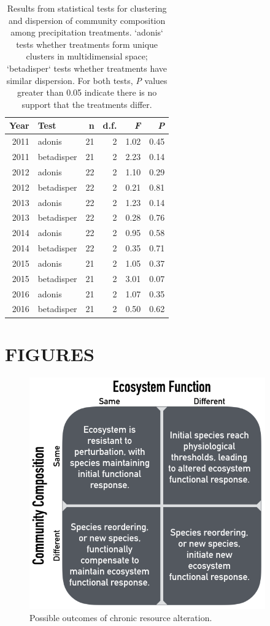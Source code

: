 \documentclass[fleqn,10pt]{wlpeerj} %
\begin{document}
\begin{table}[ht]
\centering
\caption{Results from statistical tests for clustering and dispersion of community composition among precipitation treatments. `adonis` tests whether treatments form unique clusters in multidimensial space; `betadisper` tests whether treatments have similar dispersion. For both tests, \emph{P} values greater than 0.05 indicate there is no support that the treatments differ.} 
\begingroup\normalsize
\begin{tabular}{rlrrrr}
  \hline
Year & Test & n & d.f. & \emph{F} & \emph{P} \\ 
  \hline
2011 & adonis &  21 &   2 & 1.02 & 0.45 \\ 
  2011 & betadisper &  21 &   2 & 2.23 & 0.14 \\ 
  2012 & adonis &  22 &   2 & 1.10 & 0.29 \\ 
  2012 & betadisper &  22 &   2 & 0.21 & 0.81 \\ 
  2013 & adonis &  22 &   2 & 1.23 & 0.14 \\ 
  2013 & betadisper &  22 &   2 & 0.28 & 0.76 \\ 
  2014 & adonis &  22 &   2 & 0.95 & 0.58 \\ 
  2014 & betadisper &  22 &   2 & 0.35 & 0.71 \\ 
  2015 & adonis &  21 &   2 & 1.05 & 0.37 \\ 
  2015 & betadisper &  21 &   2 & 3.01 & 0.07 \\ 
  2016 & adonis &  21 &   2 & 1.07 & 0.35 \\ 
  2016 & betadisper &  21 &   2 & 0.50 & 0.62 \\ 
   \hline
\end{tabular}
\endgroup
\end{table}

\newpage{}

\section{FIGURES}\label{figures}

\begin{figure}[!ht]
  \centering
      \includegraphics[width=4in]{../figures/hypothesis_figtable.png}
  \caption{Possible outcomes of chronic resource alteration.}
\end{figure}
\end{document}
